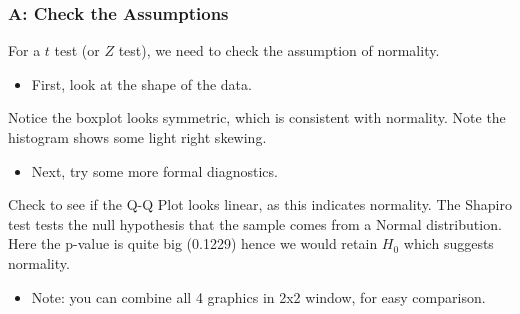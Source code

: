\documentclass[]{article}
\newenvironment{Shaded}{\begin{snugshade}}{\end{snugshade}}
\newcommand{\DataTypeTok}[1]{\textcolor[rgb]{0.13,0.29,0.53}{#1}}
\newcommand{\DecValTok}[1]{\textcolor[rgb]{0.00,0.00,0.81}{#1}}
\newcommand{\KeywordTok}[1]{\textcolor[rgb]{0.13,0.29,0.53}{\textbf{#1}}}
\newcommand{\NormalTok}[1]{#1}
\newcommand{\OperatorTok}[1]{\textcolor[rgb]{0.81,0.36,0.00}{\textbf{#1}}}
\providecommand{\tightlist}{%
  \setlength{\itemsep}{0pt}\setlength{\parskip}{0pt}}
\begin{document}
\hypertarget{a-check-the-assumptions}{%
\subsubsection{A: Check the Assumptions}\label{a-check-the-assumptions}}

For a \(t\) test (or \(Z\) test), we need to check the assumption of normality.

\begin{itemize}
\tightlist
\item
  First, look at the shape of the data.
\end{itemize}

\begin{Shaded}
\end{Shaded}

Notice the boxplot looks symmetric, which is consistent with normality. Note the histogram shows some light right skewing.

\begin{itemize}
\tightlist
\item
  Next, try some more formal diagnostics.
\end{itemize}

\begin{Shaded}
\end{Shaded}

Check to see if the Q-Q Plot looks linear, as this indicates normality. The Shapiro test tests the null hypothesis that the sample comes from a Normal distribution. Here the p-value is quite big (0.1229) hence we would retain \(H_0\) which suggests normality.

\begin{itemize}
\tightlist
\item
  Note: you can combine all 4 graphics in 2x2 window, for easy comparison.
\end{itemize}

\begin{Shaded}
\end{Shaded}
\end{document}
